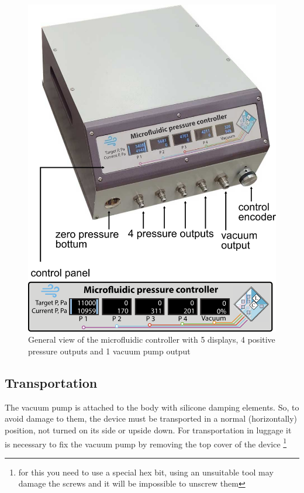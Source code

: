 \documentclass[twoside, 12pt, a4paper]{refart}
\begin{document}
    \begin{figure}[h!b]
	  \begin{center}
	  \includegraphics[width=\textwidth]{imgs/device.png}
	  \caption{General view of the microfluidic controller with 5 displays, 4 positive pressure outputs and 1 vacuum pump output}
	  \label{fig:device}
	  \end{center}
    \end{figure}


  \subsection{Transportation}
    The vacuum pump is attached to the body with silicone damping elements. So, to avoid damage to them, the device must be transported in a normal (horizontally) position, not turned on its side or upside down. For transportation in luggage it is necessary to fix the vacuum pump by removing the top cover of the device \footnote {for this you need to use a special hex bit, using an unsuitable tool may damage the screws and it will be impossible to unscrew them}
    
\end{document}

